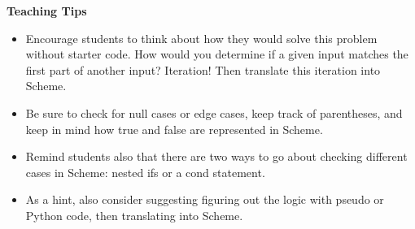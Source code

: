 \begin{blocksection}
\begin{guide}
\textbf{Teaching Tips}
\begin{itemize}
	\item Encourage students to think about how they would solve this problem without starter code. How would you determine if a given input matches the first part of another input? Iteration! Then translate this iteration into Scheme.
	\item Be sure to check for null cases or edge cases, keep track of parentheses, and keep in mind how true and false are represented in Scheme.
	\item Remind students also that there are two ways to go about checking different cases in Scheme: nested ifs or a cond statement.
	\item As a hint, also consider suggesting figuring out the logic with pseudo or Python code, then translating into Scheme.
\end{itemize}
\end{guide}
\end{blocksection}
